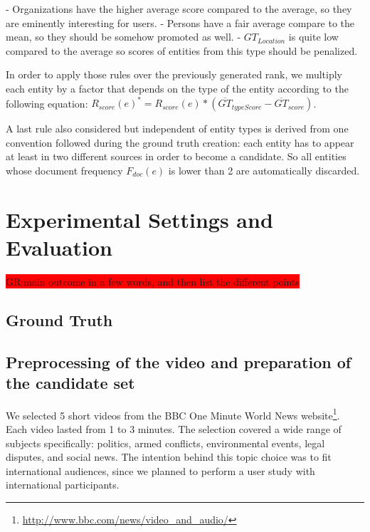 \documentclass{llncs}
\newcommand{\todo}[1]{\colorbox{red}{#1}}
\begin{document}
- Organizations have the higher average score compared to the average, so they are eminently interesting for users.
- Persons have a fair average compare to the mean, so they should be somehow promoted as well.
- $GT_{Location}$ is quite low compared to the average so scores of entities from this type should be penalized.

In order to apply those rules over the previously generated rank, we multiply each entity by a factor that depends on the type of the entity according to the following equation: $R_{score}\left ( e \right )^{*} =  R_{score}\left ( e \right ) * (\overline{GT}_{typeScore} - \overline{GT}_{score})$.

A last rule also considered but independent of entity types is derived from one convention followed during the ground truth creation: each entity has to appear at least in two different sources in order to become a candidate. So all entities whose document frequency $F_{doc}(e)$ is lower than 2 are automatically discarded.




\section{Experimental Settings and Evaluation}
\label{sec:Evaluation}
\todo{GR:main outcome in a few words, and then list the different points}

\subsection{Ground Truth}
\label{sec:GroundTruth}
\subsection{Preprocessing of the video and preparation of the candidate set}

We selected 5 short videos from the BBC One Minute World News website\footnote{\url{http://www.bbc.com/news/video_and_audio/}}. Each video lasted from 1 to 3 minutes. The selection covered a wide range of subjects specifically: politics, armed conflicts, environmental events, legal disputes, and social news. The intention behind this topic choice was to fit international audiences, since we planned to perform a user study with international participants. 
\end{document}
